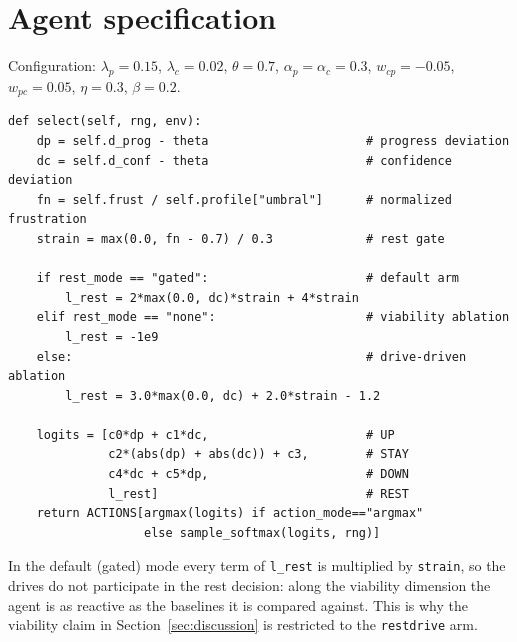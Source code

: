 \documentclass{article}
\begin{document}
\section{Agent specification}
\label{app:agent}
Configuration: $\lambda_p{=}0.15$, $\lambda_c{=}0.02$, $\theta{=}0.7$, $\alpha_p{=}\alpha_c{=}0.3$, $w_{cp}{=}-0.05$, $w_{pc}{=}0.05$, $\eta{=}0.3$, $\beta{=}0.2$.
\begin{verbatim}
def select(self, rng, env):
    dp = self.d_prog - theta                      # progress deviation
    dc = self.d_conf - theta                      # confidence deviation
    fn = self.frust / self.profile["umbral"]      # normalized frustration
    strain = max(0.0, fn - 0.7) / 0.3             # rest gate

    if rest_mode == "gated":                      # default arm
        l_rest = 2*max(0.0, dc)*strain + 4*strain
    elif rest_mode == "none":                     # viability ablation
        l_rest = -1e9
    else:                                         # drive-driven ablation
        l_rest = 3.0*max(0.0, dc) + 2.0*strain - 1.2

    logits = [c0*dp + c1*dc,                      # UP
              c2*(abs(dp) + abs(dc)) + c3,        # STAY
              c4*dc + c5*dp,                      # DOWN
              l_rest]                             # REST
    return ACTIONS[argmax(logits) if action_mode=="argmax"
                   else sample_softmax(logits, rng)]
\end{verbatim}
In the default (gated) mode every term of \texttt{l\_rest} is multiplied by \texttt{strain}, so the drives do not participate in the rest decision: along the viability dimension the agent is as reactive as the baselines it is compared against. This is why the viability claim in Section~\ref{sec:discussion} is restricted to the \texttt{restdrive} arm.
\end{document}
